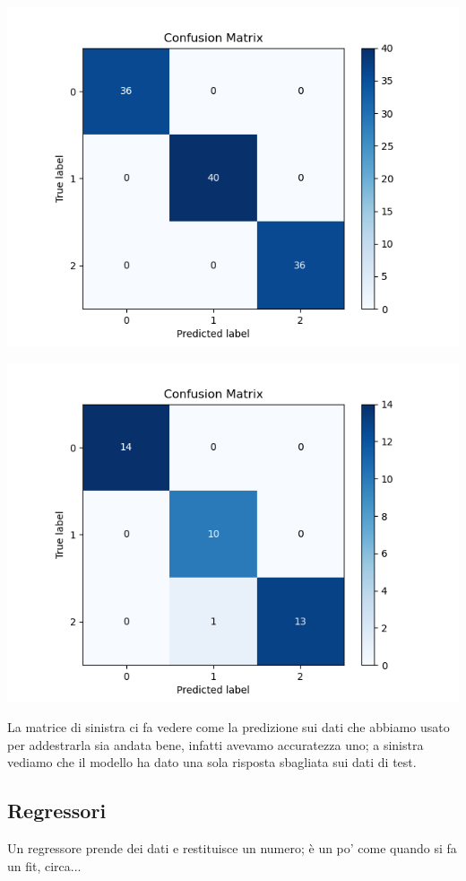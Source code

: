 \documentclass[10pt,a4paper]{article}
\begin{document}
\begin{multicols}{2}


\includegraphics[scale=0.5]{img/clas_conf_mat_train.png}


\includegraphics[scale=0.5]{img/clas_conf_mat_test.png}


\end{multicols}
La matrice di sinistra ci fa vedere come la predizione sui dati che abbiamo usato per addestrarla sia andata bene, infatti avevamo accuratezza uno; a sinistra vediamo che il modello ha dato una sola risposta sbagliata sui dati di test.

\subsection{Regressori}
Un regressore prende dei dati e restituisce un numero; è un po' come quando si fa un fit, circa...
\end{document}

